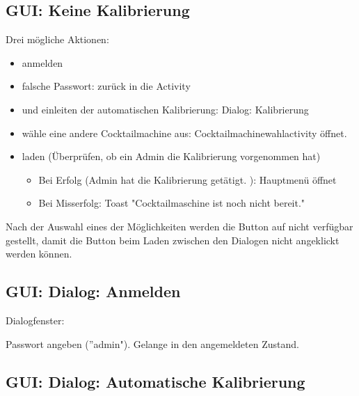 \subsection{GUI: Keine Kalibrierung}
\label{subsec:nocal}

Drei mögliche Aktionen:

\begin{itemize}
\item anmelden
\item falsche Passwort: zurück in die Activity
\item und einleiten der automatischen Kalibrierung: Dialog: Kalibrierung
\item wähle eine andere Cocktailmachine aus: Cocktailmachinewahlactivity öffnet.
\item laden (Überprüfen, ob ein Admin die Kalibrierung vorgenommen hat)
\begin{itemize}

	\item Bei Erfolg (Admin hat die Kalibrierung getätigt. ): Hauptmenü öffnet
	
	\item Bei Misserfolg: Toast "Cocktailmaschine ist noch nicht bereit."

\end{itemize}
\end{itemize}


Nach der Auswahl eines der Möglichkeiten werden die Button auf nicht verfügbar gestellt, damit die Button beim Laden zwischen den Dialogen nicht angeklickt werden können.

\subsection{GUI: Dialog: Anmelden}

Dialogfenster:

Passwort angeben (''admin"). Gelange in den angemeldeten Zustand.

\subsection{GUI: Dialog: Automatische Kalibrierung}

